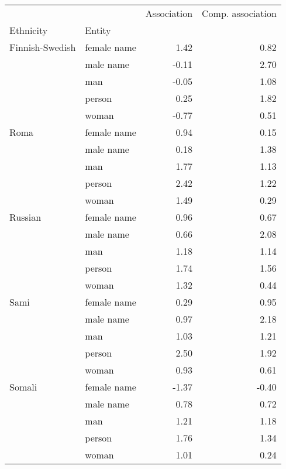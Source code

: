 \begin{tabular}{llrr}
\toprule
       &       &  Association &  Comp. association \\
Ethnicity & Entity &              &                    \\
\midrule
Finnish-Swedish & female name &         1.42 &               0.82 \\
       & male name &        -0.11 &               2.70 \\
       & man &        -0.05 &               1.08 \\
       & person &         0.25 &               1.82 \\
       & woman &        -0.77 &               0.51 \\
Roma & female name &         0.94 &               0.15 \\
       & male name &         0.18 &               1.38 \\
       & man &         1.77 &               1.13 \\
       & person &         2.42 &               1.22 \\
       & woman &         1.49 &               0.29 \\
Russian & female name &         0.96 &               0.67 \\
       & male name &         0.66 &               2.08 \\
       & man &         1.18 &               1.14 \\
       & person &         1.74 &               1.56 \\
       & woman &         1.32 &               0.44 \\
Sami & female name &         0.29 &               0.95 \\
       & male name &         0.97 &               2.18 \\
       & man &         1.03 &               1.21 \\
       & person &         2.50 &               1.92 \\
       & woman &         0.93 &               0.61 \\
Somali & female name &        -1.37 &              -0.40 \\
       & male name &         0.78 &               0.72 \\
       & man &         1.21 &               1.18 \\
       & person &         1.76 &               1.34 \\
       & woman &         1.01 &               0.24 \\
\bottomrule
\end{tabular}

